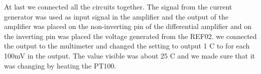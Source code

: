 At last we connected all the circuits together. The signal from the current generator was used as input signal in the amplifier and the output of the amplifier was placed on the non-inverting pin of the differential amplifier and on the inverting pin was placed the voltage generated from the REF02. we connected the output to the multimeter and changed the setting to output 1 \degree C to for each 100mV in the output. The value visible was about 25 \degree C and we made sure that  it was changing by heating the PT100.\\


